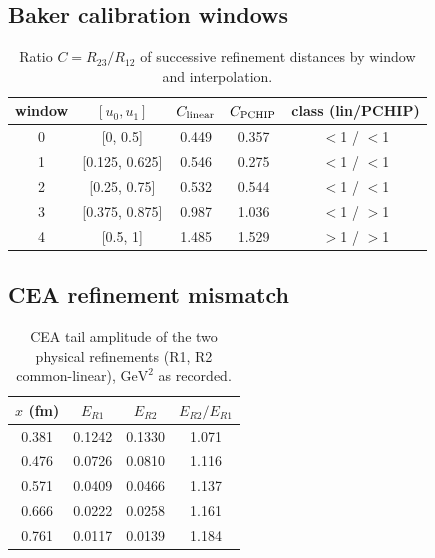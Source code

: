\documentclass[11pt,a4paper]{article}
\theoremstyle{definition}
\theoremstyle{remark}
\begin{document}
\subsection{Baker calibration windows}
\begin{table}[ht]\centering\small\caption{Ratio $C=R_{23}/R_{12}$ of successive refinement distances by window and interpolation.}
\begin{tabular}{@{}ccccc@{}}\toprule window & $[u_0,u_1]$ & $C_{\rm linear}$ & $C_{\rm PCHIP}$ & class (lin/PCHIP)\\\midrule
0 & [0, 0.5] & 0.449 & 0.357 & $<$1 / $<$1\\
1 & [0.125, 0.625] & 0.546 & 0.275 & $<$1 / $<$1\\
2 & [0.25, 0.75] & 0.532 & 0.544 & $<$1 / $<$1\\
3 & [0.375, 0.875] & 0.987 & 1.036 & $<$1 / $>$1\\
4 & [0.5, 1] & 1.485 & 1.529 & $>$1 / $>$1\\
\bottomrule\end{tabular}\end{table}
\subsection{CEA refinement mismatch}
\begin{table}[ht]\centering\small\caption{CEA tail amplitude of the two physical refinements (R1, R2 common-linear), $\mathrm{GeV}^2$ as recorded.}
\begin{tabular}{@{}cccc@{}}\toprule $x$ (fm) & $E_{R1}$ & $E_{R2}$ & $E_{R2}/E_{R1}$\\\midrule
0.381 & 0.1242 & 0.1330 & 1.071\\
0.476 & 0.0726 & 0.0810 & 1.116\\
0.571 & 0.0409 & 0.0466 & 1.137\\
0.666 & 0.0222 & 0.0258 & 1.161\\
0.761 & 0.0117 & 0.0139 & 1.184\\
\bottomrule\end{tabular}\end{table}
\end{document}
